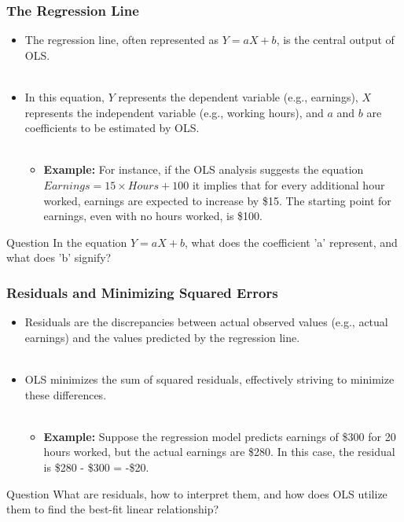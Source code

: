 \documentclass[notes,10pt, aspectratio=169]{beamer}
\begin{document}
\begin{frame}
\frametitle{The Regression Line}

\begin{itemize}
    \item  The regression line, often represented as $Y = aX + b$, is the central output of OLS.\\\\[1em]
    \item In this equation, $Y$ represents the dependent variable (e.g., earnings), $X$ represents the independent variable (e.g., working hours), and $a$ and $b$ are coefficients to be estimated by OLS.\\\\[1em]
    \begin{itemize}
        \item \textbf{Example:} For instance, if the OLS analysis suggests the equation $Earnings = 15 \times Hours + 100$ it implies that for every additional hour worked, earnings are expected to increase by \$15. The starting point for earnings, even with no hours worked, is \$100.
    \end{itemize}
\end{itemize}

\begin{exampleblock}{Question}
In the equation $Y = aX + b$, what does the coefficient 'a' represent, and what does 'b' signify?
\end{exampleblock}

\end{frame}

\begin{frame}
\frametitle{Residuals and Minimizing Squared Errors}

\begin{itemize}
    \item  Residuals are the discrepancies between actual observed values (e.g., actual earnings) and the values predicted by the regression line.\\\\[1em]
    \item OLS minimizes the sum of squared residuals, effectively striving to minimize these differences.\\\\[1em]
    \begin{itemize}
        \item \textbf{Example:} Suppose the regression model predicts earnings of \$300 for 20 hours worked, but the actual earnings are \$280. In this case, the residual is \$280 - \$300 = -\$20.
    \end{itemize}
\end{itemize}

\begin{exampleblock}{Question}
What are residuals, how to interpret them, and how does OLS utilize them to find the best-fit linear relationship?
\end{exampleblock}

\end{frame}
\end{document}
